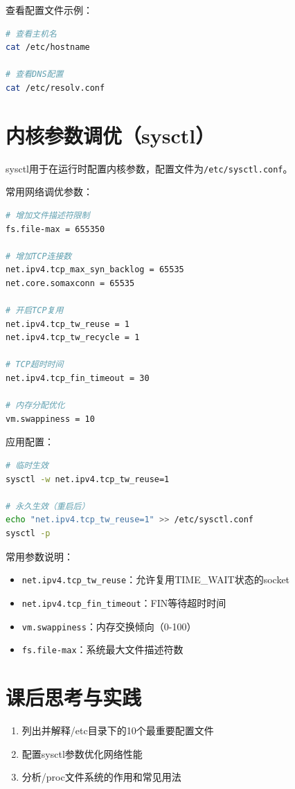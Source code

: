 \documentclass[12pt,UTF8]{ctexbook}
\begin{document}
查看配置文件示例：
\begin{lstlisting}[language=bash]
# 查看主机名
cat /etc/hostname

# 查看DNS配置
cat /etc/resolv.conf
\end{lstlisting}

\section{内核参数调优（sysctl）}
\label{sec:sysctl-tuning}

sysctl用于在运行时配置内核参数，配置文件为\texttt{/etc/sysctl.conf}。

常用网络调优参数：
\begin{lstlisting}[language=bash]
# 增加文件描述符限制
fs.file-max = 655350

# 增加TCP连接数
net.ipv4.tcp_max_syn_backlog = 65535
net.core.somaxconn = 65535

# 开启TCP复用
net.ipv4.tcp_tw_reuse = 1
net.ipv4.tcp_tw_recycle = 1

# TCP超时时间
net.ipv4.tcp_fin_timeout = 30

# 内存分配优化
vm.swappiness = 10
\end{lstlisting}

应用配置：
\begin{lstlisting}[language=bash]
# 临时生效
sysctl -w net.ipv4.tcp_tw_reuse=1

# 永久生效（重启后）
echo "net.ipv4.tcp_tw_reuse=1" >> /etc/sysctl.conf
sysctl -p
\end{lstlisting}

常用参数说明：
\begin{itemize}
    \item \texttt{net.ipv4.tcp\_tw\_reuse}：允许复用TIME\_WAIT状态的socket
    \item \texttt{net.ipv4.tcp\_fin\_timeout}：FIN等待超时时间
    \item \texttt{vm.swappiness}：内存交换倾向（0-100）
    \item \texttt{fs.file-max}：系统最大文件描述符数
\end{itemize}

\section{课后思考与实践}
\label{sec:core-practice}
\begin{enumerate}
    \item 列出并解释/etc目录下的10个最重要配置文件
    \item 配置sysctl参数优化网络性能
    \item 分析/proc文件系统的作用和常见用法
\end{enumerate}
\end{document}

